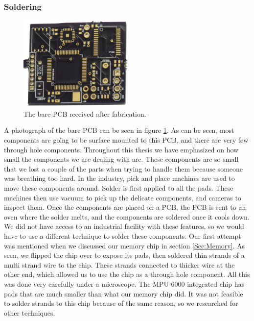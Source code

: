 \subsubsection{Soldering}
\label{Sec:Soldering}
\begin{figure}
\begin{center}
\includegraphics[width=0.5\textwidth]{images/BarePCB.jpg}
\caption{The bare PCB received after fabrication.}
\label{Fig:PCBBare}
\end{center}
\end{figure}
A photograph of the bare PCB can be seen in figure \ref{Fig:PCBBare}.
As can be seen,
most components are going to be surface mounted to this PCB,
and there are very few through hole components.
Throughout this thesis we have emphasized on how small the components we are dealing with are.
These components are so small that we lost a couple of the parts when trying to handle them because someone was breathing too hard.
In the industry,
pick and place machines are used to move these components around.
Solder is first applied to all the pads.
These machines then use vacuum to pick up the delicate components,
and cameras to inspect them. 
Once the components are placed on a PCB,
the PCB is sent to an oven where the solder melts,
and the components are soldered once it cools down.
We did not have access to an industrial facility with these features,
so we would have to use a different technique to solder these components.
Our first attempt was mentioned when we discussed our memory chip in section \ref{Sec:Memory}.
As seen, we flipped the chip over to expose its pads,
then soldered thin strands of a multi strand wire to the chip.
These strands connected to thicker wire at the other end,
which allowed us to use the chip as a through hole component.
All this was done very carefully under a microscope.
The MPU-6000 integrated chip has pads that are much smaller than what our memory chip did.
It was not feasible to solder strands to this chip because of the same reason,
so we researched for other techniques.

